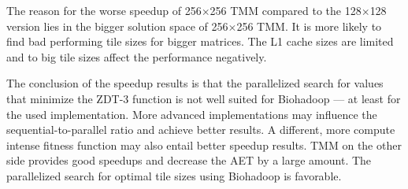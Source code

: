 The reason for the worse speedup of 256$\times$256 TMM compared to the 128$\times$128 version lies in the bigger solution space of 256$\times$256 TMM. It is more likely to find bad performing tile sizes for bigger matrices. The L1 cache sizes are limited and to big tile sizes affect the performance negatively.

The conclusion of the speedup results is that the parallelized search for values that minimize the ZDT-3 function is not well suited for Biohadoop --- at least for the used implementation. More advanced implementations may influence the sequential-to-parallel ratio and achieve better results. A different, more compute intense fitness function may also entail better speedup results. TMM on the other side provides good speedups and decrease the AET by a large amount. The parallelized search for optimal tile sizes using Biohadoop is favorable.


